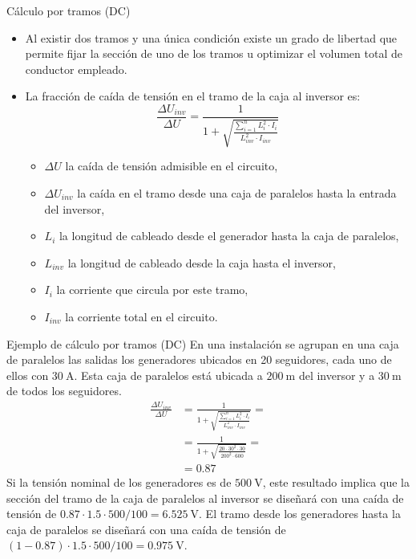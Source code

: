\documentclass[aspectratio=169, usenames,svgnames,dvipsnames]{beamer}
\begin{document}
\begin{frame}[label={sec:org1fee6ee}]{Cálculo por tramos (DC)}
\begin{itemize}
\item Al existir dos tramos y una única condición existe un grado de libertad que permite fijar la sección de uno de los tramos u optimizar el volumen total de conductor empleado.

\item La fracción de caída de tensión en el tramo de la caja al inversor es:  
\begin{equation*}
  \frac{\Delta U_{inv}}{\Delta U}= \frac{1}{1+\sqrt{\frac{\sum_{i=1}^nL_{i}^2
        \cdot I_{i}}{L_{inv}^2 \cdot I_{inv}}}}
\end{equation*}

\begin{itemize}
\item \(\Delta U\) la caída de tensión admisible en el circuito,

\item \(\Delta U_{inv}\) la caída en el tramo desde una caja de paralelos hasta la entrada del inversor,

\item \(L_i\) la longitud de cableado desde el generador hasta la caja de paralelos,
\item \(L_{inv}\) la longitud de cableado desde la caja hasta el inversor,

\item \(I_i\) la corriente que circula por este tramo,

\item \(I_{inv}\) la corriente total en el circuito.
\end{itemize}
\end{itemize}
\end{frame}

\begin{frame}[label={sec:org1a53c47}]{Ejemplo de cálculo por tramos (DC)}
En una instalación se agrupan en una caja de paralelos las salidas los generadores ubicados en 20 seguidores, cada uno de ellos con \(\qty{30}{\ampere}\). Esta caja de paralelos está ubicada a \(\qty{200}{\meter}\) del inversor y a \(\qty{30}{\meter}\) de todos los seguidores.
\begin{align*}
  \frac{\Delta U_{inv}}{\Delta U} &= \frac{1}{1+\sqrt{\frac{\sum_{i=1}^nL_{i}^2
                                    \cdot I_{i}}{L_{inv}^2 \cdot I_{inv}}}} = \\
                                  &=\frac{1}{1 + \sqrt{\frac{20 \cdot 30^2 \cdot 30}{200^2 \cdot 600 }}} = \\
                                  &= \num{0.87}
\end{align*}
Si la tensión nominal de los generadores es de \(\qty{500}{\volt}\), este resultado implica que la sección del tramo de la caja de paralelos al inversor se diseñará con una caída de tensión de \(\num{0.87} \cdot \num{1.5} \cdot 500 /100 = \qty{6.525}{\volt}\). El tramo desde los generadores hasta la caja de paralelos se diseñará con una caída de tensión de \((1 - \num{0.87}) \cdot \num{1.5} \cdot 500 /100 = \qty{0.975}{\volt}\).
\end{frame}
\end{document}
